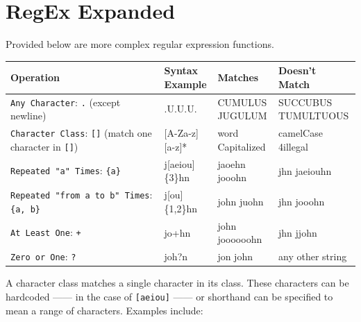 \documentclass[
  letterpaper,
  DIV=11,
  numbers=noendperiod]{scrreprt}
\begin{document}
\section{RegEx Expanded}\label{regex-expanded}

Provided below are more complex regular expression functions.

\begin{longtable}[]{@{}
  >{\raggedright\arraybackslash}p{}
  >{\raggedright\arraybackslash}p{}
  >{\raggedright\arraybackslash}p{}
  >{\raggedright\arraybackslash}p{}@{}}
\toprule\noalign{}
\begin{minipage}[b]{\linewidth}\raggedright
Operation
\end{minipage} & \begin{minipage}[b]{\linewidth}\raggedright
Syntax Example
\end{minipage} & \begin{minipage}[b]{\linewidth}\raggedright
Matches
\end{minipage} & \begin{minipage}[b]{\linewidth}\raggedright
Doesn't Match
\end{minipage} \\
\midrule\noalign{}
\endhead
\bottomrule\noalign{}
\endlastfoot
\texttt{Any\ Character}: \texttt{.} (except newline) & .U.U.U. & CUMULUS
JUGULUM & SUCCUBUS TUMULTUOUS \\
\texttt{Character\ Class}: \texttt{{[}{]}} (match one character in
\texttt{{[}{]}}) & {[}A-Za-z{]}{[}a-z{]}* & word Capitalized & camelCase
4illegal \\
\texttt{Repeated\ "a"\ Times}: \texttt{\{a\}} & j{[}aeiou{]}\{3\}hn &
jaoehn jooohn & jhn jaeiouhn \\
\texttt{Repeated\ "from\ a\ to\ b"\ Times}: \texttt{\{a,\ b\}} &
j{[}ou{]}\{1,2\}hn & john juohn & jhn jooohn \\
\texttt{At\ Least\ One}: \texttt{+} & jo+hn & john joooooohn & jhn
jjohn \\
\texttt{Zero\ or\ One}: \texttt{?} & joh?n & jon john & any other
string \\
\end{longtable}

A character class matches a single character in its class. These
characters can be hardcoded ------ in the case of \texttt{{[}aeiou{]}}
------ or shorthand can be specified to mean a range of characters.
Examples include:
\end{document}
